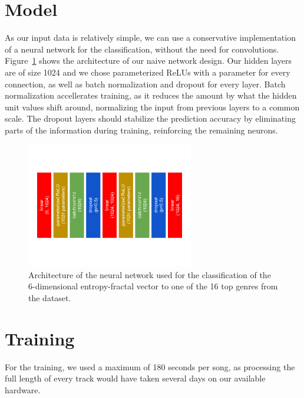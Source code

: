 \section{Model}
As our input data is relatively simple, we can use a conservative
implementation of a neural network for the classification, without the
need for convolutions. Figure~\ref{entropymodel} shows the architecture
of our naive network design. Our hidden layers are of size 1024 and we
chose parameterized ReLUs with a parameter for every connection, as well
as batch normalization and dropout for every layer. Batch normalization
accellerates training, as it reduces the amount by what the hidden unit
values shift around, normalizing the input from previous layers to a
common scale. The dropout layers should stabilize the prediction
accuracy by eliminating parts of the information during training,
reinforcing the remaining neurons.

\begin{figure}
	\centering
	\includegraphics[width=0.65\textwidth]{images/entropymodel.png}
	\caption{Architecture of the neural network used for the classification
	of the 6-dimensional entropy-fractal vector to one of the 16 top
	genres from the dataset.}
	\label{entropymodel}
\end{figure}

\section{Training}
For the training, we used a maximum of 180 seconds per song, as processing
the full length of every track would have taken several days on our
available hardware.

